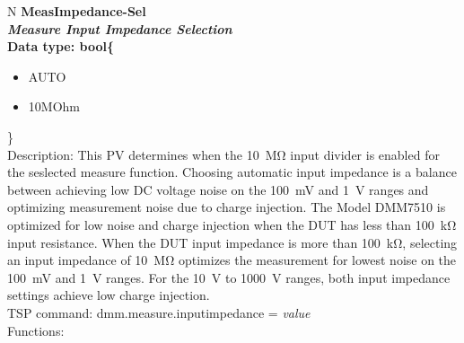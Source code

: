 \documentclass[openany]{article}
\begin{document}
		\begin{tabular}{N}
			\hline
			\bfseries MeasImpedance-Sel\label{pv:measimpedance-sel} \\ \hline
			\emph{Measure Input Impedance Selection} \\
			Data type: bool\{\begin{itemize}[noitemsep]
				\small
				\item[] AUTO
				\item[] 10MOhm
			\end{itemize}\} \\
			Description: This PV determines when the \SI{10}{\mega\ohm} input divider is enabled for the seslected measure function. Choosing automatic input impedance is a balance between achieving low DC voltage noise on the \SI{100}{\milli\volt} and \SI{1}{\volt} ranges and optimizing measurement noise due to charge injection. The Model DMM7510 is optimized for low noise and charge injection when the DUT has less than \SI{100}{\kilo\ohm} input resistance. When the DUT input impedance is more than \SI{100}{\kilo\ohm}, selecting an input impedance of \SI{10}{\mega\ohm} optimizes the measurement for lowest noise on the \SI{100}{\milli\volt} and \SI{1}{\volt} ranges. For the \SI{10}{\volt} to \SI{1000}{\volt} ranges, both input impedance settings achieve low charge injection. \\
			TSP command: dmm.measure.inputimpedance = \emph{value} \\
			Functions: \\
			\arrayrulecolor{\FuncTableBorderColor}

		\end{tabular}
\end{document}
